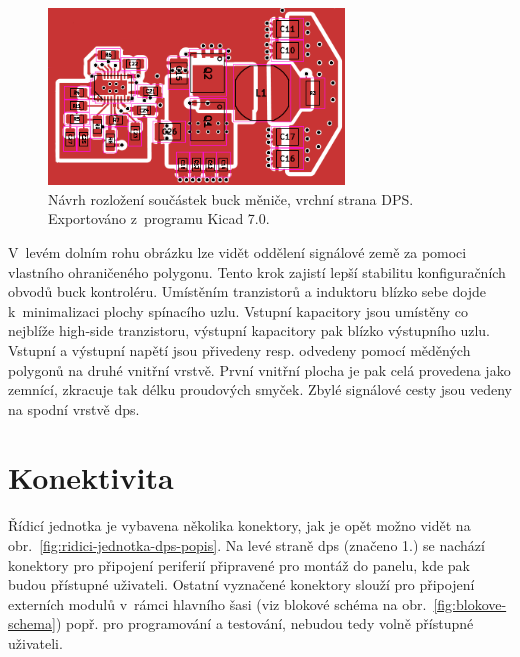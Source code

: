             \begin{figure}[h!]
                \centering
                \includegraphics[width=0.7\textwidth]{obrazky/exportovane/lm5148buck-edit.png}
                \caption{Návrh rozložení součástek buck měniče, vrchní strana DPS. Exportováno z~programu Kicad 7.0.}
                \label{fig:lm5148buck-edit-png}
            \end{figure}
            
            V~levém dolním rohu obrázku lze vidět oddělení signálové země za pomoci vlastního ohraničeného polygonu. Tento krok zajistí lepší stabilitu konfiguračních obvodů buck kontroléru. Umístěním tranzistorů a induktoru blízko sebe dojde k~minimalizaci plochy spínacího uzlu.
            Vstupní kapacitory jsou umístěny co nejblíže high-side tranzistoru, výstupní kapacitory pak blízko výstupního uzlu. Vstupní a výstupní napětí jsou přivedeny resp. odvedeny pomocí měděných polygonů na druhé vnitřní vrstvě. První vnitřní plocha je pak celá provedena jako zemnící, zkracuje tak délku proudových smyček. Zbylé signálové cesty jsou vedeny na spodní vrstvě \acs{dps}.

    \section{Konektivita}
        Řídicí jednotka je vybavena několika konektory, jak je opět možno vidět na obr.~\ref{fig:ridici-jednotka-dps-popis}. Na levé straně \acs{dps} (značeno 1.) se nachází konektory pro připojení periferií připravené pro montáž do panelu, kde pak budou přístupné uživateli. Ostatní vyznačené konektory slouží pro připojení externích modulů v~rámci hlavního šasi (viz blokové schéma na obr.~\ref{fig:blokove-schema}) popř. pro programování a testování, nebudou tedy volně přístupné uživateli.


